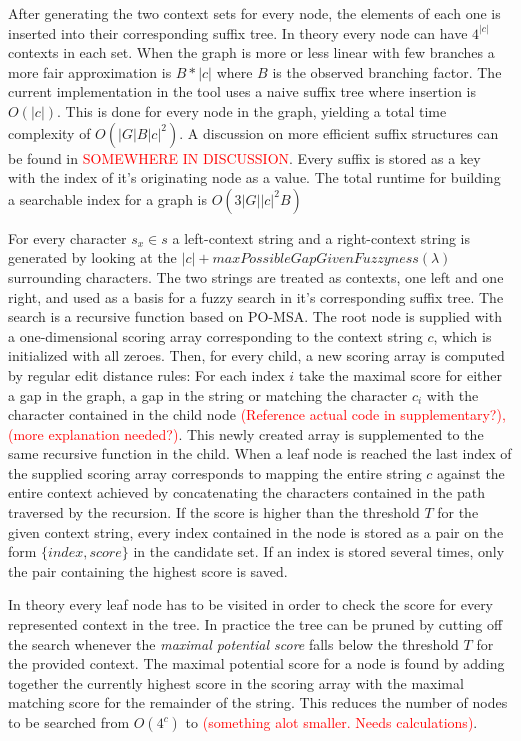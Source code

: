 \documentclass{article}
\begin{document}
After generating the two context sets for every node, the elements of each one is inserted into their corresponding suffix tree. In theory every node can have $4^{|c|}$ contexts in each set. When the graph is more or less linear with few branches a more fair approximation is $B*|c|$ where $B$ is the observed branching factor. The current implementation in the tool uses a naive suffix tree where insertion is $O(|c|)$. This is done for every node in the graph, yielding a total time complexity of $O(|G|B|c|^2)$. A discussion on more efficient suffix structures can be found in \textcolor{red}{SOMEWHERE IN DISCUSSION}. Every suffix is stored as a key with the index of it's originating node as a value. The total runtime for building a searchable index for a graph is $O(3|G||c|^2B)$
\par\noindent
For every character $s_x \in s$ a left-context string and a right-context string is generated by looking at the $|c| + maxPossibleGapGivenFuzzyness(\lambda)$ surrounding characters. The two strings are treated as contexts, one left and one right, and used as a basis for a fuzzy search in it's corresponding suffix tree. The search is a recursive function based on PO-MSA. The root node is supplied with a one-dimensional scoring array corresponding to the context string $c$, which is initialized with all zeroes. Then, for every child, a new scoring array is computed by regular edit distance rules: For each index $i$ take the maximal score for either a gap in the graph, a gap in the string or matching the character $c_i$ with the character contained in the child node \textcolor{red}{(Reference actual code in supplementary?), (more explanation needed?)}. This newly created array is supplemented to the same recursive function in the child. When a leaf node is reached the last index of the supplied scoring array corresponds to mapping the entire string $c$ against the entire context achieved by concatenating the characters contained in the path traversed by the recursion. If the score is higher than the threshold $T$ for the given context string, every index contained in the node is stored as a pair on the form $\{index, score\}$ in the candidate set. If an index is stored several times, only the pair containing the highest score is saved.\\
\par\noindent
\par
In theory every leaf node has to be visited in order to check the score for every represented context in the tree. In practice the tree can be pruned by cutting off the search whenever the \textit{maximal potential score} falls below the threshold $T$ for the provided context. The maximal potential score for a node is found by adding together the currently highest score in the scoring array with the maximal matching score for the remainder of the string. This reduces the number of nodes to be searched from $O(4^c)$ to \textcolor{red}{(something alot smaller. Needs calculations)}.\\
\end{document}
